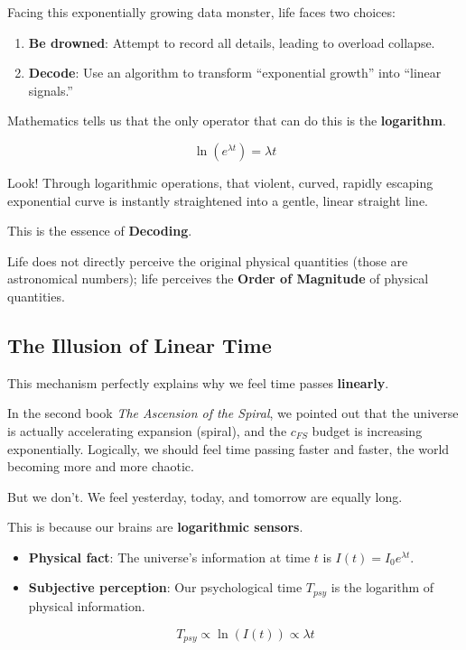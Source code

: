 Facing this exponentially growing data monster, life faces two choices:

\begin{enumerate}
\item \textbf{Be drowned}: Attempt to record all details, leading to overload collapse.

\item \textbf{Decode}: Use an algorithm to transform ``exponential growth'' into ``linear signals.''
\end{enumerate}

Mathematics tells us that the only operator that can do this is the \textbf{logarithm}.

$$\ln(e^{\lambda t}) = \lambda t$$

Look! Through logarithmic operations, that violent, curved, rapidly escaping exponential curve is instantly straightened into a gentle, linear straight line.

This is the essence of \textbf{Decoding}.

Life does not directly perceive the original physical quantities (those are astronomical numbers); life perceives the \textbf{Order of Magnitude} of physical quantities.

\subsection{The Illusion of Linear Time}

This mechanism perfectly explains why we feel time passes \textbf{linearly}.

In the second book \textit{The Ascension of the Spiral}, we pointed out that the universe is actually accelerating expansion (spiral), and the $c_{FS}$ budget is increasing exponentially. Logically, we should feel time passing faster and faster, the world becoming more and more chaotic.

But we don't. We feel yesterday, today, and tomorrow are equally long.

This is because our brains are \textbf{logarithmic sensors}.

\begin{itemize}
\item \textbf{Physical fact}: The universe's information at time $t$ is $I(t) = I_0 e^{\lambda t}$.

\item \textbf{Subjective perception}: Our psychological time $T_{psy}$ is the logarithm of physical information.

    $$T_{psy} \propto \ln(I(t)) \propto \lambda t$$
\end{itemize}

